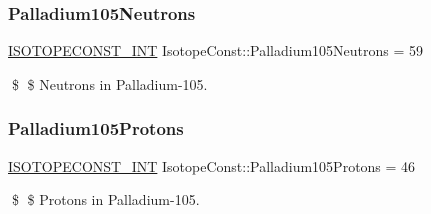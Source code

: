 \subsubsection{\texorpdfstring{Palladium105\+Neutrons}{Palladium105Neutrons}}
{\footnotesize\ttfamily \mbox{\hyperlink{group___isotope_const-_macros_ga5f18360b3e99483a35c32d789e62621c}{I\+S\+O\+T\+O\+P\+E\+C\+O\+N\+S\+T\+\_\+\+I\+NT}} Isotope\+Const\+::\+Palladium105\+Neutrons = 59}

\$ \$ Neutrons in Palladium-\/105. \mbox{\label{group___isotope_const-_palladium-_pd105_ga0903490454b96790d9ee6e66a810e403}} 
\subsubsection{\texorpdfstring{Palladium105\+Protons}{Palladium105Protons}}
{\footnotesize\ttfamily \mbox{\hyperlink{group___isotope_const-_macros_ga5f18360b3e99483a35c32d789e62621c}{I\+S\+O\+T\+O\+P\+E\+C\+O\+N\+S\+T\+\_\+\+I\+NT}} Isotope\+Const\+::\+Palladium105\+Protons = 46}

\$ \$ Protons in Palladium-\/105. 